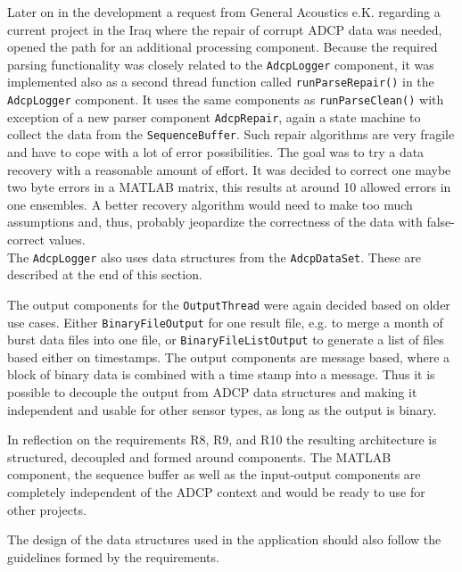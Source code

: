 Later on in the development a request from General Acoustics e.K. regarding a current project in the Iraq where the repair of corrupt ADCP data was needed, opened the path for an additional processing component. Because the required parsing functionality was closely related to the \texttt{AdcpLogger} component, it was implemented also as a second thread function called \texttt{runParseRepair()} in the \texttt{AdcpLogger} component. It uses the same components as \texttt{runParseClean()} with exception of a new parser component \texttt{AdcpRepair}, again a state machine to collect the data from the \texttt{SequenceBuffer}. Such repair algorithms are very fragile and have to cope with a lot of error possibilities. The goal was to try a data recovery with a reasonable amount of effort. It was decided to correct one maybe two byte errors in a MATLAB matrix, this results at around 10 allowed errors in one ensembles. A better recovery algorithm would need to make too much assumptions and, thus, probably jeopardize the correctness of the data with false-correct values.\\
The \texttt{AdcpLogger} also uses data structures from the \texttt{AdcpDataSet}. These are described at the end of this section.

The output components for the \texttt{OutputThread} were again decided based on older use cases. Either \texttt{BinaryFileOutput} for one result file, e.g. to merge a month of burst data files into one file, or \texttt{BinaryFileListOutput} to generate a list of files based either on timestamps. The output components are message based, where a block of binary data is combined with a time stamp into a message. Thus it is possible to decouple the output from ADCP data structures and making it independent and usable for other sensor types, as long as the output is binary. 

In reflection on the requirements R8, R9, and R10 the resulting architecture is structured, decoupled and formed around components. The MATLAB component, the sequence buffer as well as the input-output components are completely independent of the ADCP context and would be ready to use for other projects.

The design of the data structures used in the application should also follow the guidelines formed by the requirements. 
\vspace{9em}

